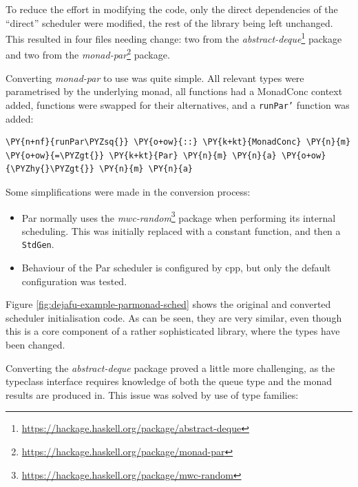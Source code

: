 To reduce the effort in modifying the code, only the direct
dependencies of the ``direct'' scheduler were modified, the rest of
the library being left unchanged. This resulted in four files needing
change: two from the
\textit{abstract-deque}\footnote{\url{https://hackage.haskell.org/package/abstract-deque}}
package and two from the
\textit{monad-par}\footnote{\url{https://hackage.haskell.org/package/monad-par}}
package.

Converting \textit{monad-par} to use \dejafu{} was quite simple. All
relevant types were parametrised by the underlying monad, all
functions had a MonadConc context added, functions were swapped for
their \dejafu{} alternatives, and a \texttt{runPar'} function was
added:


\begin{Verbatim}[commandchars=\\\{\}]
\PY{n+nf}{runPar\PYZsq{}} \PY{o+ow}{::} \PY{k+kt}{MonadConc} \PY{n}{m} \PY{o+ow}{=\PYZgt{}} \PY{k+kt}{Par} \PY{n}{m} \PY{n}{a} \PY{o+ow}{\PYZhy{}\PYZgt{}} \PY{n}{m} \PY{n}{a}
\end{Verbatim}

Some simplifications were made in the conversion process:

\begin{itemize}
  \item Par normally uses the
    \textit{mwc-random}\footnote{\url{https://hackage.haskell.org/package/mwc-random}}
    package when performing its internal scheduling. This was
    initially replaced with a constant function, and then a
    \texttt{StdGen}.

  \item Behaviour of the Par scheduler is configured by cpp, but only
    the default configuration was tested.
\end{itemize}

Figure \ref{fig:dejafu-example-parmonad-sched} shows the original and
converted scheduler initialisation code. As can be seen, they are very
similar, even though this is a core component of a rather
sophisticated library, where the types have been changed.

Converting the \textit{abstract-deque} package proved a little more
challenging, as the typeclass interface requires knowledge of both the
queue type and the monad results are produced in. This issue was
solved by use of type families:

